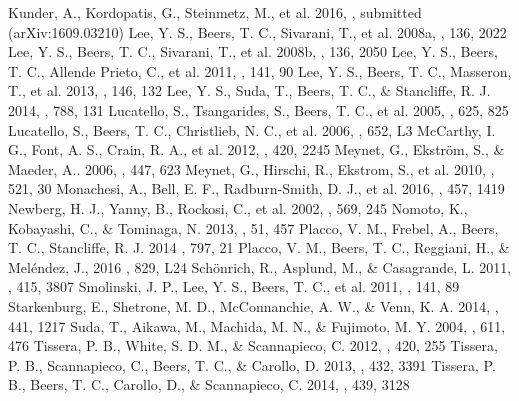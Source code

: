 \documentclass[iop]{emulateapj}
\begin{document}
\begin{thebibliography}{123456789}
 Kunder, A., Kordopatis, G., Steinmetz, M., et al. 2016, \aj, submitted (arXiv:1609.03210)
 Lee, Y. S., Beers, T. C., Sivarani, T., et al. 2008a, \aj, 136, 2022
 Lee, Y. S., Beers, T. C., Sivarani, T., et al. 2008b, \aj, 136, 2050
 Lee, Y. S., Beers, T. C., Allende Prieto, C., et al. 2011, \aj, 141, 90
 Lee, Y. S., Beers, T. C., Masseron, T., et al. 2013, \aj, 146, 132
 Lee, Y. S., Suda, T., Beers, T. C., \& Stancliffe, R. J. 2014, \apj, 788, 131
 Lucatello, S., Tsangarides, S., Beers, T. C., et al. 2005, \apj, 625, 825
 Lucatello, S., Beers, T. C., Christlieb, N. C., et al. 2006, \apj, 652, L3
 McCarthy, I. G., Font, A. S., Crain, R. A., et al. 2012, \mnras, 420, 2245
 Meynet, G., Ekstr\"om, S., \& Maeder, A.. 2006, \aap, 447, 623
 Meynet, G., Hirschi, R., Ekstrom, S., et al. 2010, \aap, 521, 30
 Monachesi, A., Bell, E. F., Radburn-Smith, D. J., et al. 2016, \mnras, 457, 1419
 Newberg, H. J., Yanny, B., Rockosi, C., et al. 2002, \apj, 569, 245
 Nomoto, K., Kobayashi, C., \& Tominaga, N. 2013, \araa, 51, 457
 Placco, V. M., Frebel, A., Beers, T. C., Stancliffe, R. J. 2014 \apj, 797, 21
 Placco, V. M., Beers, T. C., Reggiani, H., \& Mel\'endez, J., 2016 \apj, 829, L24
 Sch\"onrich, R., Asplund, M., \& Casagrande, L. 2011, \mnras, 415, 3807
 Smolinski, J. P., Lee, Y. S., Beers, T. C., et al. 2011, \aj, 141, 89
 Starkenburg, E., Shetrone, M. D., McConnanchie, A. W., \& Venn, K. A. 2014, \mnras, 441, 1217
 Suda, T., Aikawa, M., Machida, M. N., \& Fujimoto, M. Y. 2004, \apj, 611, 476
 Tissera, P. B., White, S. D. M., \& Scannapieco, C. 2012, \mnras, 420, 255
 Tissera, P. B., Scannapieco, C., Beers, T. C., \& Carollo, D. 2013, \mnras, 432, 3391
 Tissera, P. B., Beers, T. C., Carollo, D., \& Scannapieco, C. 2014, \mnras, 439, 3128

\end{thebibliography}
\end{document}

